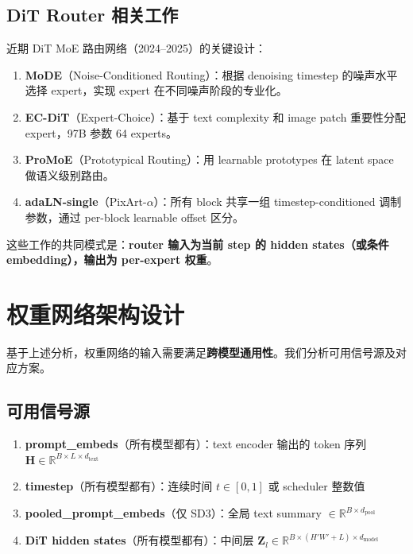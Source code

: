 \documentclass[11pt,a4paper]{article}
\newcommand{\R}{\mathbb{R}}
\theoremstyle{definition}
\begin{document}
\subsection{DiT Router 相关工作}

近期 DiT MoE 路由网络（2024--2025）的关键设计：

\begin{enumerate}[leftmargin=2em]
    \item \textbf{MoDE}（Noise-Conditioned Routing）：根据 denoising timestep 的噪声水平选择 expert，实现 expert 在不同噪声阶段的专业化。
    \item \textbf{EC-DiT}（Expert-Choice）：基于 text complexity 和 image patch 重要性分配 expert，97B 参数 64 experts。
    \item \textbf{ProMoE}（Prototypical Routing）：用 learnable prototypes 在 latent space 做语义级别路由。
    \item \textbf{adaLN-single}（PixArt-$\alpha$）：所有 block 共享一组 timestep-conditioned 调制参数，通过 per-block learnable offset 区分。
\end{enumerate}

这些工作的共同模式是：\textbf{router 输入为当前 step 的 hidden states（或条件 embedding），输出为 per-expert 权重}。

\section{权重网络架构设计}

基于上述分析，权重网络的输入需要满足\textbf{跨模型通用性}。我们分析可用信号源及对应方案。

\subsection{可用信号源}

\begin{enumerate}[leftmargin=2em]
    \item \textbf{prompt\_embeds}（所有模型都有）：text encoder 输出的 token 序列 $\mathbf{H} \in \R^{B \times L \times d_{\text{text}}}$
    \item \textbf{timestep}（所有模型都有）：连续时间 $t \in [0, 1]$ 或 scheduler 整数值
    \item \textbf{pooled\_prompt\_embeds}（仅 SD3）：全局 text summary $\in \R^{B \times d_{\text{pool}}}$
    \item \textbf{DiT hidden states}（所有模型都有）：中间层 $\mathbf{Z}_l \in \R^{B \times (H'W' + L) \times d_{\text{model}}}$
\end{enumerate}
\end{document}
